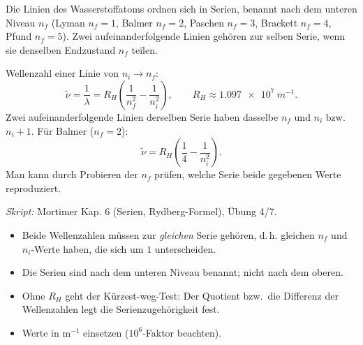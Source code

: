 

Die Linien des Wasserstoffatoms ordnen sich in Serien, benannt nach dem
unteren Niveau $n_f$ (Lyman $n_f=1$, Balmer $n_f=2$, Paschen $n_f=3$,
Brackett $n_f=4$, Pfund $n_f=5$). Zwei aufeinanderfolgende Linien gehören
zur selben Serie, wenn sie denselben Endzustand $n_f$ teilen.

\begin{werkzeugkasten}
Wellenzahl einer Linie von $n_i \to n_f$:
\begin{equation}
  \tilde\nu = \frac{1}{\lambda} = R_H\left(\frac{1}{n_f^2}
  - \frac{1}{n_i^2}\right),
  \qquad R_H \approx \qty{1.097e7}{m^{-1}}.
\end{equation}
Zwei aufeinanderfolgende Linien derselben Serie haben dasselbe $n_f$ und
$n_i$ bzw.\ $n_i+1$. Für Balmer ($n_f=2$):
\begin{equation}
  \tilde\nu = R_H\!\left(\frac14 - \frac{1}{n_i^2}\right).
\end{equation}
Man kann durch Probieren der $n_f$ prüfen, welche Serie beide
gegebenen Werte reproduziert.

\textit{Skript:} Mortimer Kap. 6 (Serien, Rydberg-Formel), Übung 4/7.
\end{werkzeugkasten}

\begin{achtung}
\begin{itemize}
  \item Beide Wellenzahlen müssen zur \emph{gleichen} Serie gehören, d.\,h.
        gleichen $n_f$ und $n_i$-Werte haben, die sich um $1$ unterscheiden.
  \item Die Serien sind nach dem unteren Niveau benannt; nicht nach dem
        oberen.
  \item Ohne $R_H$ geht der Kürzest-weg-Test: Der Quotient bzw.\ die
        Differenz der Wellenzahlen legt die Serienzugehörigkeit fest.
  \item Werte in m$^{-1}$ einsetzen ($10^6$-Faktor beachten).
\end{itemize}
\end{achtung}
